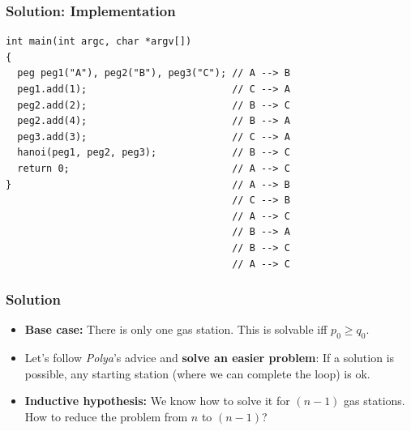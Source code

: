 \documentclass{beamer}
\newcommand{\uvalink}[2]{UVa Online Judge (http://uva.onlinejudge.org)
  problem number \href{#2}{\textcolor{blue}{#1}.}}
\newcounter{exo}
\newcommand{\exo}{
  \addtocounter{exo}{1}
  Exercice \arabic{exo}
}
\begin{document}
\begin{frame}[containsverbatim]
\frametitle{Solution: Implementation}

\scriptsize
\begin{lstlisting}
int main(int argc, char *argv[])
{
  peg peg1("A"), peg2("B"), peg3("C"); // A --> B
  peg1.add(1);                         // C --> A
  peg2.add(2);                         // B --> C
  peg2.add(4);                         // B --> A
  peg3.add(3);                         // C --> A
  hanoi(peg1, peg2, peg3);             // B --> C
  return 0;                            // A --> C
}                                      // A --> B
                                       // C --> B
                                       // A --> C
                                       // B --> A
                                       // B --> C
                                       // A --> C

\end{lstlisting}

\end{frame}

\fi


\ifanswers

\begin{frame}%
\frametitle{Solution}


\begin{itemize}

\item \textbf{Base case:} There is only one gas station. This is solvable iff $p_0 \ge q_0$.

\vspace{0.3cm}

\item<2-> Let's follow \emph{Polya}'s advice and \textbf{solve an easier problem}: If a solution is possible, any starting station (where
we can complete the loop) is ok.

\vspace{0.3cm}

\item<3-> \textbf{Inductive hypothesis:} We know how to solve it for $(n-1)$ gas stations. How to reduce
the problem from $n$ to $(n-1)$?

\end{itemize}

\end{frame}
\end{document}

